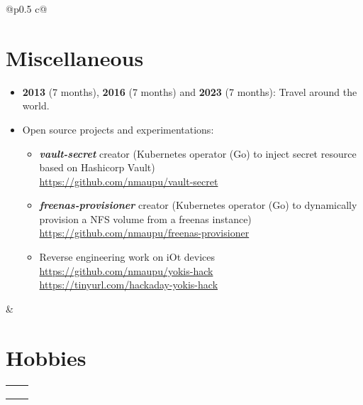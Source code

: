 \documentclass[darkhipster]{hipstercv}
\newcommand{\cvsection}[1] {%
	\section*{\textbf{#1}}
}%
\renewcommand{\hobbyicon}[5]{%
	\begin{tikzpicture}%
		\draw[draw=none,fill=#3,opacity=.55] (0,0) circle (0.58);%
		\node[](icon) at (0,0) {#4#1};%
		\node[below=#5,align=center] at (icon) {#2};%
	\end{tikzpicture}
}
\begin{document}
\begin{paracol}{2}
\begin{tabular}[t]{@{}p{} c@{}}
{\begin{minipage}[t]{0.5\textwidth}
\vspace{1.5em}

\cvsection{Miscellaneous}
\small
\begin{itemize}
	\item {\bfseries{2013}} (7 months), {\bfseries{2016}} (7 months) and {\bfseries{2023}} (7 months): Travel around the world.
	\item Open source projects and experimentations:
	\begin{itemize}
		\item \emph{\bfseries{vault-secret}} creator (Kubernetes operator (Go) to inject secret resource based on Hashicorp Vault) \\ {\footnotesize \url{https://github.com/nmaupu/vault-secret}}
		\item \emph{\bfseries{freenas-provisioner}} creator (Kubernetes operator (Go) to dynamically provision a NFS volume from a freenas instance) \\ {\footnotesize \url{https://github.com/nmaupu/freenas-provisioner}}
		\item Reverse engineering work on iOt devices \\ {\footnotesize \url{https://github.com/nmaupu/yokis-hack}} \\ {\footnotesize \url{https://tinyurl.com/hackaday-yokis-hack}}
	\end{itemize}
\end{itemize}

\end{minipage}
} & {
\begin{minipage}[t]{0.19\textwidth}
\cvsection{Hobbies}
	\begin{tabular}[t]{cc}
	\hobbyicon{\color{iconcolour}\faPlane}{Travel}{cvgreen}{\iconsize}{2em} &
	\hobbyicon{\color{iconcolour}\faCamera}{Photo}{cvorange}{\iconsize}{2em} \\
	\hobbyicon{\color{iconcolour}\faWrench}{DIY}{cvpurple}{\iconsize}{2em} &
	\hobbyicon{\color{iconcolour}\faChessPawn}{Chess}{lightgray}{\iconsize}{2em} \\
	\hobbyicon{\color{iconcolour}\faGamepad}{Games}{red}{\iconsize}{2em} &
	\hobbyicon{\color{iconcolour}\faMountain}{Climbing}{cyan}{\iconsize}{2em} \\
	\end{tabular}
\end{minipage}
} \\

\end{tabular}

\end{paracol}
\end{document}
